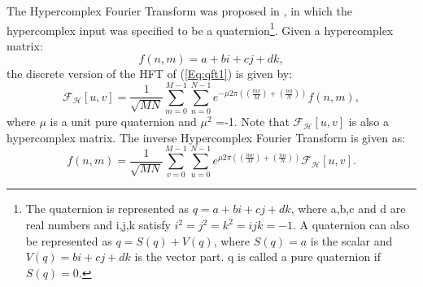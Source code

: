 \documentclass[10pt,journal,cspaper,compsoc]{IEEEtran}
\begin{document}
The Hypercomplex Fourier Transform was proposed in \cite{ell2002quaternion}, in which the hypercomplex input was specified to be a quaternion\footnote{The quaternion is represented as $q=a+bi+cj+dk$, where a,b,c and d are real numbers and i,j,k satisfy $ i^{2}=j^{2}=k^{2}=ijk=-1$. A quaternion can also be represented as $q=S(q)+V(q)$, where $S(q)=a$ is the scalar and $V(q)=bi+cj+dk$ is the vector part. q is called a pure quaternion if $S(q)=0$.}.  Given a hypercomplex matrix:
\begin{equation}
f(n,m)=a+bi+cj+dk,
\label{Eq:qft1}
\end{equation}
the discrete version of the HFT of (\ref{Eq:qft1}) is given by:
\begin{equation}
\mathcal {F_{H}}[u,v]=\frac{1}{\sqrt{MN}}\sum^{M-1}_{m=0}{\sum^{N-1}_{n=0}e^{-\mu 2\pi((\frac{mv}{M})+(\frac{nu}{N}))}}f(n,m),
\label{Eq:qft2}
\end{equation}
where $\mu$  is a unit pure quaternion and $\mu^{2}$ =-1. Note that $\mathcal {F_{H}}[u,v]$ is also a hypercomplex matrix. The inverse Hypercomplex Fourier Transform is given as:
\begin{equation}
f(n,m)=\frac{1}{\sqrt{MN}}\sum^{M-1}_{v=0}{\sum^{N-1}_{u=0}e^{\mu 2\pi((\frac{mv}{M})+(\frac{nu}{N}))}}\mathcal {F_{H}}[u,v].
\label{Eq:qft3}
\end{equation}
\end{document}
